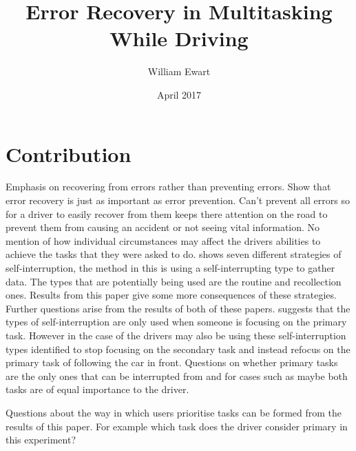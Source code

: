 \documentclass[12pt]{article}
\title{Error Recovery in Multitasking While Driving}
\author{William Ewart}
\date{April 2017}
\begin{document}
\begin{titlingpage}
\maketitle
\tableofcontents
\end{titlingpage}
\newpage

\section{Contribution}
Emphasis on recovering from errors rather than preventing errors.
Show that error recovery is just as important as error prevention. Can't prevent all errors so for a driver to easily recover from them keeps there attention on the road to prevent them from causing an accident or not seeing vital information. 
No mention of how individual circumstances may affect the drivers abilities to achieve the tasks that they were asked to do. \cite{Janssen}
\cite{Jin} shows seven different strategies of self-interruption, the method in this is using a self-interrupting type to gather data. The types that are potentially being used are the routine and recollection ones. Results from this paper give some more consequences of these strategies. Further questions arise from the results of both of these papers. \cite{Jin} suggests that the types of self-interruption are only used when someone is focusing on the primary task. However in the case of \cite{Lee} the drivers may also be using these self-interruption types identified to stop focusing on the secondary task and instead refocus on the primary task of following the car in front. Questions on whether primary tasks are the only ones that can be interrupted from and for cases such as \cite{Lee} maybe both tasks are of equal importance to the driver.

Questions about the way in which users prioritise tasks can be formed from the results of this paper. For example which task does the driver consider primary in this experiment? 
\end{document}

